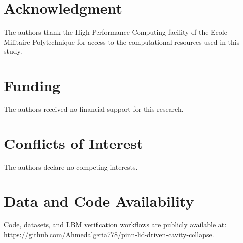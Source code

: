 \documentclass[a4paper,11pt]{article}
\begin{document}
\section*{Acknowledgment}
The authors thank the High-Performance Computing facility of the Ecole Militaire
Polytechnique for access to the computational resources used in this study.

\section*{Funding}
The authors received no financial support for this research.

\section*{Conflicts of Interest}
The authors declare no competing interests.

\section*{Data and Code Availability}
Code, datasets, and LBM verification workflows are publicly available at:
\url{https://github.com/Ahmedalgeria778/pinn-lid-driven-cavity-collapse}.
\end{document}

